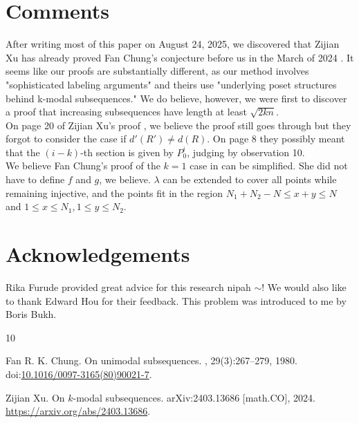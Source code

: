 \documentclass{article}
\begin{document}
\section{Comments}
After writing most of this paper on August 24, 2025, we discovered that Zijian Xu has already proved Fan Chung's conjecture before us in the March of 2024 \cite{xu}. It seems like our proofs are substantially different, as our method involves "sophisticated labeling arguments" and theirs use "underlying poset structures behind k-modal subsequences." \cite{xu} We do believe, however, we were first to discover a proof that increasing subsequences have length at least $\sqrt{2kn}$. \\

On page 20 of Zijian Xu's proof \cite{xu}, we believe the proof still goes through but they forgot to consider the case if $d'(R') \neq d(R)$. On page 8 they possibly meant that the $(i-k)$-th section is given by $P_0^{i}$, judging by observation 10. \\

We believe Fan Chung's proof of the $k = 1$ case in \cite{chung} can be simplified. She did not have to define $f$ and $g$, we believe. $\lambda$ can be extended to cover all points while remaining injective, and the points fit in the region $N_1 + N_2 - N \leq x+y \leq N$ and $1 \leq x \leq N_1, 1 \leq y \leq N_2$. 

\section{Acknowledgements}
Rika Furude provided great advice for this research nipah $\sim$! We would also like to thank Edward Hou for their feedback. This problem was introduced to me by Boris Bukh. \\



\begin{thebibliography}{10}

Fan R. K. Chung.
\newblock On unimodal subsequences.
, 29(3):267--279, 1980.
\newblock doi:\href{https://doi.org/10.1016/0097-3165(80)90021-7}{10.1016/0097-3165(80)90021-7}.

Zijian Xu.
\newblock On $k$-modal subsequences.
\newblock arXiv:2403.13686 [math.CO], 2024.
\newblock \url{https://arxiv.org/abs/2403.13686}.

\end{thebibliography}
\end{document}
